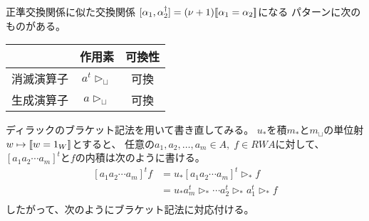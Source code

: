 		正準交換関係に似た交換関係
		$[\alpha_1,\alpha_2^\dag]=(\nu+1)[\![\alpha_1=\alpha_2]\!]$になる
		パターンに次のものがある。\\
		\begin{minipage}{0.5\hsize}
			\begin{center}\begin{tabular}{c|cc}
				& 作用素 & 可換性 \\ \hline
				消滅演算子 & $a^t\rhd_\sqcup$ & 可換 \\
				生成演算子 & $a\rhd_\sqcup$ & 可換 \\
			\end{tabular}\end{center}
		\end{minipage}

		ディラックのブラケット記法を用いて書き直してみる。
		$u_*$を積$m_*$と$m_\sqcup$の単位射$w\mapsto [\![w=1_W]\!]$とすると、
		任意の$a_1,a_2,\dots,a_m\in A,\;f\in RWA$に対して、
		$[a_1a_2\cdots a_m]^t$と$f$の内積は次のように書ける。
		\begin{equation*}\begin{split} %
			[a_1a_2\cdots a_m]^t f &= u_*[a_1a_2\cdots a_m]^t\rhd_* f \\
			&= u_*a_m^t\rhd_*\cdots a_2^t\rhd_*a_1^t\rhd_* f \\
		\end{split}\end{equation*} %
		したがって、次のようにブラケット記法に対応付ける。
